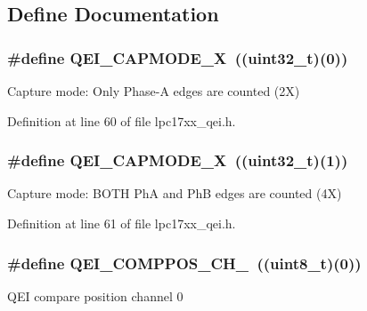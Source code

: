 \subsection{\-Define \-Documentation}
\hypertarget{group___q_e_i___public___macros_ga1c2eca335aca9bed2bb5305ff1affef7}{
\subsubsection[{\-Q\-E\-I\-\_\-\-C\-A\-P\-M\-O\-D\-E\-\_\-2\-X}]{\setlength{\rightskip}{0pt plus 5cm}\#define {\bf \-Q\-E\-I\-\_\-\-C\-A\-P\-M\-O\-D\-E\-\_\-X}~((uint32\-\_\-t)(0))}}\label{group___q_e_i___public___macros_ga1c2eca335aca9bed2bb5305ff1affef7}
\-Capture mode\-: \-Only \-Phase-\/\-A edges are counted (2\-X) 

\-Definition at line 60 of file lpc17xx\-\_\-qei.\-h.

\hypertarget{group___q_e_i___public___macros_ga3e650125e39f2f9d6fe8f1c2e4147b47}{
\subsubsection[{\-Q\-E\-I\-\_\-\-C\-A\-P\-M\-O\-D\-E\-\_\-4\-X}]{\setlength{\rightskip}{0pt plus 5cm}\#define {\bf \-Q\-E\-I\-\_\-\-C\-A\-P\-M\-O\-D\-E\-\_\-X}~((uint32\-\_\-t)(1))}}\label{group___q_e_i___public___macros_ga3e650125e39f2f9d6fe8f1c2e4147b47}
\-Capture mode\-: \-B\-O\-T\-H \-Ph\-A and \-Ph\-B edges are counted (4\-X) 

\-Definition at line 61 of file lpc17xx\-\_\-qei.\-h.

\hypertarget{group___q_e_i___public___macros_ga72e128cb0a1b99f517999bf0fa25f613}{
\subsubsection[{\-Q\-E\-I\-\_\-\-C\-O\-M\-P\-P\-O\-S\-\_\-\-C\-H\-\_\-0}]{\setlength{\rightskip}{0pt plus 5cm}\#define {\bf \-Q\-E\-I\-\_\-\-C\-O\-M\-P\-P\-O\-S\-\_\-\-C\-H\-\_}~((uint8\-\_\-t)(0))}}\label{group___q_e_i___public___macros_ga72e128cb0a1b99f517999bf0fa25f613}
\-Q\-E\-I compare position channel 0 

